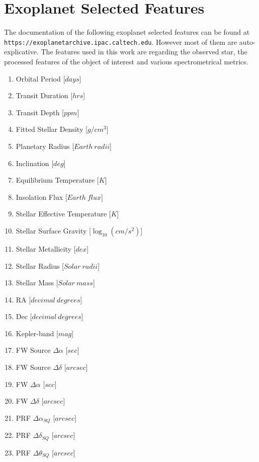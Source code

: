 \documentclass[11pt, a4paper]{article}
\begin{document}
\section{Exoplanet Selected Features}
  The documentation of the following exoplanet selected features can be found at \texttt{https://exoplanetarchive.ipac.caltech.edu}.
  However most of them are auto-explicative.
  The features used in this work are regarding the observed star, the processed features of the object of interest and various spectrometrical metrics.
  \begin{multicols}{2}
    \label{appendix:features}
    \begin{enumerate}
      \item Orbital Period [$days$]
      \item Transit Duration [$hrs$]
      \item Transit Depth [$ppm$]
      \item Fitted Stellar Density [$g/cm^{3}$]
      \item Planetary Radius [$Earth\:radii$]
      \item Inclination [$deg$]
      \item Equilibrium Temperature [$K$]
      \item Insolation Flux [$Earth\:flux$]
      \item Stellar Effective Temperature [$K$]
      \item Stellar Surface Gravity [$\log_{10}(cm/s^{2})$]
      \item Stellar Metallicity [$dex$]
      \item Stellar Radius [$Solar\:radii$]
      \item Stellar Mass [$Solar\:mass$]
      \item RA [$decimal\:degrees$]
      \item Dec [$decimal\:degrees$]
      \item Kepler-band [$mag$]
      \item FW Source $\Delta\alpha$ [$sec$]
      \item FW Source $\Delta\delta$ [$arcsec$]
      \item FW $\Delta\alpha$ [$sec$]
      \item FW $\Delta\delta$ [$arcsec$]
      \item PRF $\Delta\alpha_{SQ}$ [$arcsec$]
      \item PRF $\Delta\delta_{SQ}$ [$arcsec$]
      \item PRF $\Delta\theta_{SQ}$ [$arcsec$]
    \end{enumerate}
  \end{multicols}
\end{document}
